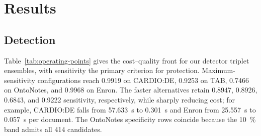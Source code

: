 \section{Results}\label{sec:results}

\subsection{Detection}\label{sec:results-detection}


\begin{table}[t]
  \caption{Operating points on both error rates. Sensitivity is over the identifier types the
  conditions replace, specificity over every other token. Cost is seconds per document; the rule is
  $\cup$ union, $\cap$ intersection, $v$ at-least-$k$ vote, $s$ a single
  detector.}\label{tab:operating-points}
  \centering\scriptsize\setlength{\tabcolsep}{2.2pt}
\end{table}

Table~\ref{tab:operating-points} gives the cost--quality front for our detector triplet ensembles, with sensitivity the primary criterion for protection. Maximum-sensitivity configurations reach 0.9919 on CARDIO:DE, 0.9253 on TAB, 0.7466 on OntoNotes, and 0.9968 on Enron. The faster alternatives retain 0.8947, 0.8926, 0.6843, and 0.9222 sensitivity, respectively, while sharply reducing cost; for example, CARDIO:DE falls from \SI{57.633}{s} to \SI{0.301}{s} and Enron from \SI{25.557}{s} to \SI{0.057}{s} per document. The OntoNotes specificity rows coincide because the \SI{10}{\percent} band admits all 414 candidates.

